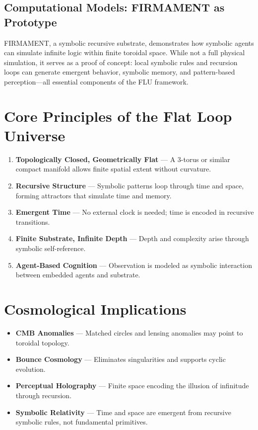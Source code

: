\documentclass[12pt]{article}
\begin{document}
\subsection{Computational Models: FIRMAMENT as Prototype}
FIRMAMENT, a symbolic recursive substrate, demonstrates how symbolic agents can simulate infinite logic within finite toroidal space. While not a full physical simulation, it serves as a proof of concept: local symbolic rules and recursion loops can generate emergent behavior, symbolic memory, and pattern-based perception---all essential components of the FLU framework.

\section{Core Principles of the Flat Loop Universe}

\begin{enumerate}
    \item \textbf{Topologically Closed, Geometrically Flat} — A 3-torus or similar compact manifold allows finite spatial extent without curvature.
    \item \textbf{Recursive Structure} — Symbolic patterns loop through time and space, forming attractors that simulate time and memory.
    \item \textbf{Emergent Time} — No external clock is needed; time is encoded in recursive transitions.
    \item \textbf{Finite Substrate, Infinite Depth} — Depth and complexity arise through symbolic self-reference.
    \item \textbf{Agent-Based Cognition} — Observation is modeled as symbolic interaction between embedded agents and substrate.
\end{enumerate}

\section{Cosmological Implications}

\begin{itemize}
    \item \textbf{CMB Anomalies} — Matched circles and lensing anomalies may point to toroidal topology.
    \item \textbf{Bounce Cosmology} — Eliminates singularities and supports cyclic evolution.
    \item \textbf{Perceptual Holography} — Finite space encoding the illusion of infinitude through recursion.
    \item \textbf{Symbolic Relativity} — Time and space are emergent from recursive symbolic rules, not fundamental primitives.
\end{itemize}
\end{document}
